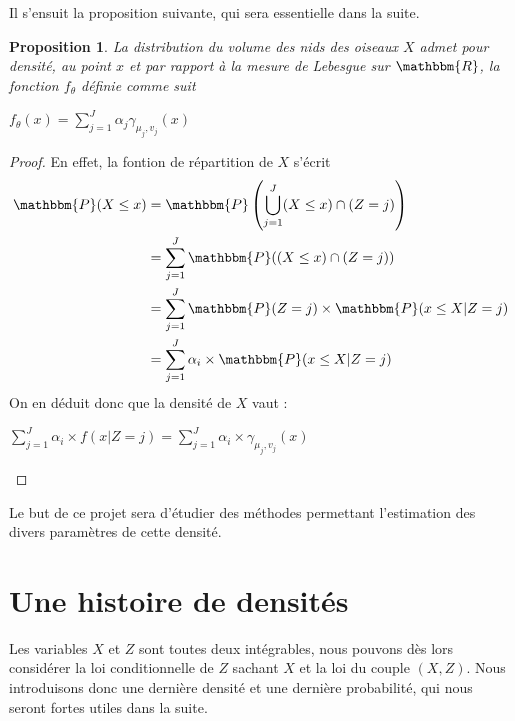 \documentclass[frenchb]{report}
\newcommand{\R}{\mathbbm{R}}
\newcommand{\1}{\mathbbm{1}}
\newcommand{\prob}{\mathbbm{P}}
\newtheorem{prop}{Proposition}
\theoremstyle{definition}\newtheorem{defn}{Définition}
\theoremstyle{definition}\newtheorem{exm}{Exemple}
\theoremstyle{definition}\newtheorem{nota}{Notation}
\theoremstyle{definition}\newtheorem{rem}{Remarque}
\begin{document}
Il s'ensuit la proposition suivante, qui sera essentielle dans la suite.
\begin{prop}
La distribution du volume des nids des oiseaux $X$ admet pour densité, au point $x$ et par rapport à la mesure de Lebesgue sur $\R$, la fonction $f_ \theta$ définie comme suit
\begin{center} $f_\theta(x) = \displaystyle\sum_{j=1}^J \alpha_j \gamma_{\mu_j, v_j}(x) $ \end{center}
\end{prop}

\begin{proof}
En effet, la fontion de répartition de $X$ s'écrit
\begin{align*}
\prob(X\leq x) &= \prob\left(\bigcup_{j=1}^J (X\leq x)\cap(Z=j)\right)\\
&=\displaystyle\sum_{j=1}^J \prob((X\leq x)\cap(Z=j))\\
&=\displaystyle\sum_{j=1}^J\prob(Z=j)\times\prob(x\leq X | Z = j) \\
&=\displaystyle\sum_{j=1}^J\alpha_i\times\prob(x\leq X | Z = j) \\
\end{align*}
On en déduit donc que la densité de $X$ vaut :
\begin{center}
$\displaystyle\sum_{j=1}^J\alpha_i\times f(x| Z = j)  = \displaystyle\sum_{j=1}^J\alpha_i\times \gamma_{\mu_j, v_j}(x)$
\end{center}
\end{proof}

Le but de ce projet sera d'étudier des méthodes permettant l'estimation des divers paramètres de cette densité.

\section{Une histoire de densités}
Les variables $X$ et $Z$ sont toutes deux intégrables, nous pouvons dès lors considérer la loi conditionnelle de $Z$ sachant $X$ et la loi du couple $(X,Z)$. Nous introduisons donc une dernière densité et une dernière probabilité, qui nous seront fortes utiles dans la suite. 
\end{document}
